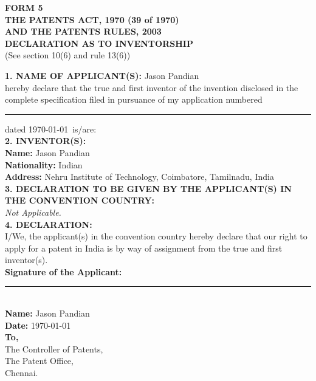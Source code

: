 \documentclass[12pt,a4paper]{article}
\begin{document}
\begin{center}
    \textbf{\large FORM 5} \\
    \vspace{0.3cm}
    \textbf{THE PATENTS ACT, 1970 (39 of 1970)} \\
    \textbf{AND THE PATENTS RULES, 2003} \\
    \vspace{0.5cm}
    \textbf{\large DECLARATION AS TO INVENTORSHIP} \\
    (See section 10(6) and rule 13(6))
\end{center}
\vspace{1cm}

\noindent \textbf{1. NAME OF APPLICANT(S):} Jason Pandian \\

\noindent hereby declare that the true and first inventor of the invention disclosed in the complete specification filed in pursuance of my application numbered \rule{3cm}{0.4pt} dated \today \ is/are: \\

\noindent \textbf{2. INVENTOR(S):} \\
\textbf{Name:} Jason Pandian \\
\textbf{Nationality:} Indian \\
\textbf{Address:} Nehru Institute of Technology, Coimbatore, Tamilnadu, India \\

\noindent \textbf{3. DECLARATION TO BE GIVEN BY THE APPLICANT(S) IN THE CONVENTION COUNTRY:} \\
\textit{Not Applicable.} \\

\noindent \textbf{4. DECLARATION:} \\
I/We, the applicant(s) in the convention country hereby declare that our right to apply for a patent in India is by way of assignment from the true and first inventor(s). \\

\vspace{2cm}
\noindent \textbf{Signature of the Applicant:} \rule{4cm}{0.4pt} \\
\textbf{Name:} Jason Pandian \\
\textbf{Date:} \today \\

\vspace{2cm}
\noindent \textbf{To,} \\
The Controller of Patents, \\
The Patent Office, \\
Chennai.
\end{document}
